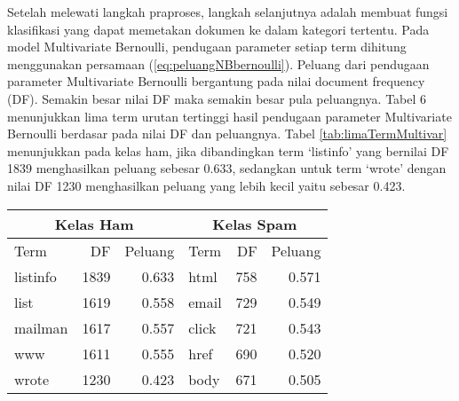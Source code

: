 Setelah melewati langkah praproses, langkah selanjutnya adalah membuat fungsi klasifikasi yang dapat memetakan dokumen ke dalam kategori tertentu. Pada model Multivariate Bernoulli, pendugaan parameter setiap term dihitung menggunakan persamaan (\ref{eq:peluangNBbernoulli}). Peluang dari pendugaan parameter Multivariate Bernoulli bergantung pada nilai document frequency (DF). Semakin besar nilai DF maka semakin besar pula peluangnya. Tabel 6 menunjukkan lima term urutan tertinggi hasil pendugaan parameter Multivariate Bernoulli berdasar pada nilai DF dan peluangnya. Tabel \ref{tab:limaTermMultivar} menunjukkan pada kelas ham, jika dibandingkan term ‘listinfo’ yang bernilai DF 1839 menghasilkan peluang sebesar 0.633, sedangkan untuk term ‘wrote’ dengan nilai DF 1230 menghasilkan peluang yang lebih kecil yaitu sebesar 0.423.
\begin{table*}[h!]
	\begin{center}
		\caption{Lima term hasil pendugaan pada Multivariate Bernoulli}
		\label{tab:limaTermMultivar}
		\begin{tabular}{l r r | l r r}
			\hline
			\multicolumn{3}{c|}{Kelas Ham}&\multicolumn{3}{c}{Kelas Spam}\\
			\hline
			Term&DF&Peluang&Term&DF&Peluang\\
			\hline
			listinfo&1839&0.633&html&758&0.571\\
			list&1619&0.558&email&729&0.549\\
			mailman&1617&0.557&click&721&0.543\\
			www&1611&0.555&href&690&0.520\\
			wrote&1230&0.423&body&671&0.505\\
			\hline
		\end{tabular}
	\end{center}
\end{table*}

